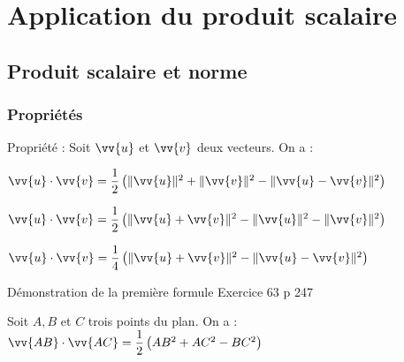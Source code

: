\chapter[Appl. Prod Scal.]{Application du produit scalaire}
\thispagestyle{fancy}

    \section{Produit scalaire et norme}
    
    \subsection{Propriétés}
    
    \begin{propriete}
        Propriété : Soit $\vv{u}$ et $\vv{v}$ deux vecteurs. On a :
        \begin{itemDef}
            \item $\vv{u} \cdot \vv{v}=\dfrac{1}{2}\left(\|\vv{u}\|^{2}+\|\vv{v}\|^{2}-\|\vv{u}-\vv{v}\|^{2}\right)$
            \item $\vv{u} \cdot \vv{v}=\dfrac{1}{2}\left(\|\vv{u}+\vv{v}\|^{2}-\|\vv{u}\|^{2}-\|\vv{v}\|^{2}\right)$
            \item $\vv{u} \cdot \vv{v}=\dfrac{1}{4}\left(\|\vv{u}+\vv{v}\|^{2}-\|\vv{u}-\vv{v}\|^{2}\right)$
        \end{itemDef}
    \end{propriete}
    
    \begin{demonstrationTitre}{Démonstration de la première formule}
        Exercice 63 p 247
    \end{demonstrationTitre}

    \begin{propriete}
        Soit $A, B$ et $C$ trois points du plan. On a :
        $\vv{A B} \cdot \vv{A C}=\dfrac{1}{2}\left(A B^{2}+A C^{2}-B C^{2}\right)$
    \end{propriete}
    
    \begin{demonstration}
    \end{demonstration}
    

